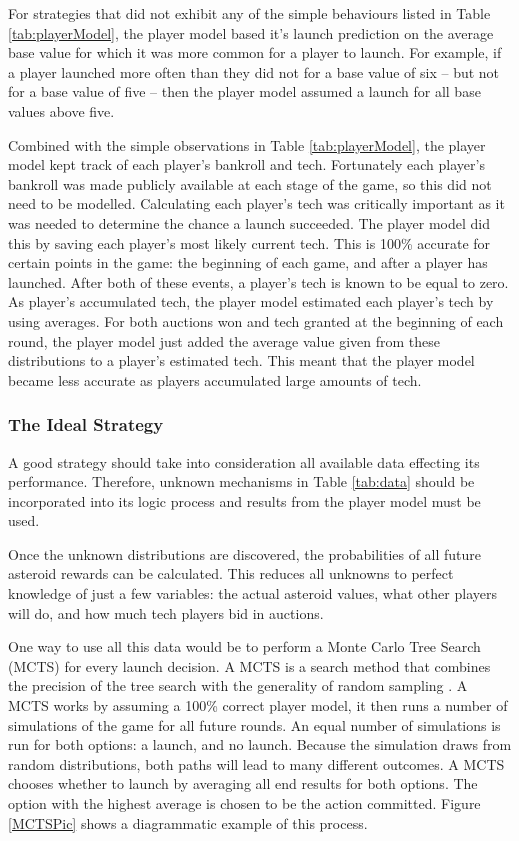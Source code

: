 \documentclass[11pt, twoside]{article}
\begin{document}
For strategies that did not exhibit any of the simple behaviours listed in Table \ref{tab:playerModel}, the player model based it's launch prediction on the average base value for which it was more common for a player to launch. For example, if a player launched more often than they did not for a base value of six -- but not for a base value of five -- then the player model assumed a launch for all base values above five. 

Combined with the simple observations in Table \ref{tab:playerModel}, the player model kept track of each player's bankroll and tech. Fortunately each player's bankroll was made publicly available at each stage of the game, so this did not need to be modelled. Calculating each player's tech was critically important as it was needed to determine the chance a launch succeeded. The player model did this by saving each player's most likely current tech. This is 100\% accurate for certain points in the game: the beginning of each game, and after a player has launched. After both of these events, a player's tech is known to be equal to zero. As player's accumulated tech, the player model estimated each player's tech by using averages. For both auctions won and tech granted at the beginning of each round, the player model just added the average value given from these distributions to a player's estimated tech. This meant that the player model became less accurate as players accumulated large amounts of tech.

\subsubsection*{The Ideal Strategy}
A good strategy should take into consideration all available data effecting its performance. Therefore, unknown mechanisms in Table \ref{tab:data} should be incorporated into its logic process and results from the player model must be used.

Once the unknown distributions are discovered, the probabilities of all future asteroid rewards can be calculated. This reduces all unknowns to perfect knowledge of just a few variables: the actual asteroid values, what other players will do, and how much tech players bid in auctions.

One way to use all this data would be to perform a Monte Carlo Tree Search (MCTS) for every launch decision. A MCTS is a search method that combines the precision of the tree search with the generality of random sampling \cite{browne2012survey}. A MCTS works by assuming a 100\% correct player model, it then runs a number of simulations of the game for all future rounds. An equal number of simulations is run for both options: a launch, and no launch. Because the simulation draws from random distributions, both paths will lead to many different outcomes. A MCTS chooses whether to launch by averaging all end results for both options. The option with the highest average is chosen to be the action committed. Figure \ref{MCTSPic} shows a diagrammatic example of this process.
\end{document}
